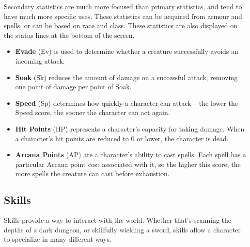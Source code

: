 Secondary statistics are much more focused than primary statistics, and
tend to have much more specific uses.  These statistics can be acquired
from armour and spells, or can be based on race and class.  These
statistics are also displayed on the status lines at the bottom of the
screen.

\begin{itemize}
\item {\bf Evade} (Ev) is used to determine whether a creature successfully
avoids an incoming attack.

\item {\bf Soak} (Sk) reduces the amount of damage on a successful attack,
removing one point of damage per point of Soak.

\item {\bf Speed} (Sp) determines how quickly a character can attack -- the
lower the Speed score, the sooner the character can act again.

\item {\bf Hit Points} (HP) represents a character's capacity for taking 
damage.  When a character's hit points are reduced to 0 or lower, the 
character is dead.

\item {\bf Arcana Points} (AP) are a character's ability to cast spells.  
Each spell has a particular Arcana point cost associated with it, so the 
higher this score, the more spells the creature can cast before exhaustion.
\end{itemize}

\subsection{Skills}

Skills provide a way to interact with the world.  Whether that's scanning
the depths of a dark dungeon, or skillfully wielding a sword, skills allow
a character to specialize in many different ways.

